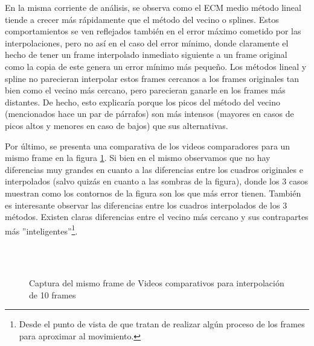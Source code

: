 \par En la misma corriente de an\'alisis, se observa como el ECM medio m\'etodo
lineal tiende a crecer m\'as r\'apidamente que el m\'etodo del vecino o splines.
Estos comportamientos se ven reflejados tambi\'en en el error m\'aximo cometido
por las interpolaciones, pero no as\'i en el caso del error m\'inimo, donde
claramente el hecho de tener un frame interpolado inmediato siguiente a un frame
original como la copia de este genera un error m\'inimo m\'as peque\~no. Los
m\'etodos lineal y spline no parecieran interpolar estos frames cercanos a los
frames originales tan bien como el vecino m\'as cercano, pero parecieran ganarle
en los frames m\'as distantes. De hecho, esto explicar\'ia porque los picos
del m\'etodo del vecino (mencionados hace un par de p\'arrafos) son m\'as
intensos (mayores en casos de picos altos y menores en caso de bajos) que sus
alternativas.

\par Por \'ultimo, se presenta una comparativa de los videos comparadores para
un mismo frame en la figura \ref{fig:movil-fija_heatmap}. Si bien en el mismo
observamos que no hay diferencias muy grandes en cuanto a las diferencias entre
los cuadros originales e interpolados (salvo quiz\'as en cuanto a las sombras
de la figura), donde los 3 casos muestran como los contornos de la figura son
los que m\'as error tienen. Tambi\'en es interesante observar las diferencias
entre los cuadros interpolados de los 3 m\'etodos. Existen claras diferencias
entre el vecino m\'as cercano y sus contrapartes m\'as ''inteligentes''\footnote{Desde
el punto de vista de que tratan de realizar alg\'un proceso de los frames para
aproximar al movimiento.}.

\begin{figure}[H]
    \centering
    \\
    \\
    \caption{Captura del mismo frame de Videos comparativos para interpolaci\'on de 10 frames}
    \label{fig:movil-fija_heatmap}
\end{figure}

